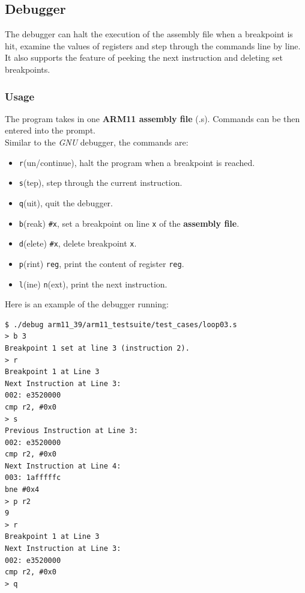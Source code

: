 \documentclass[11pt, a4paper]{article}
\begin{document}
\subsection{Debugger}
The debugger can halt the execution of the assembly file when a breakpoint is hit, examine the values of registers and step through the commands line by line. It also supports the feature of peeking the next instruction and deleting set breakpoints.
\subsubsection{Usage}
The program takes in one \textbf{ARM11 assembly file} (.s). Commands can be then entered into the prompt.\\ Similar to the \textit{GNU} debugger, the commands are:
\begin{itemize}
  \setlength\itemsep{0em}
  \item \texttt{r}(un/continue), halt the program when a breakpoint is reached.
  \item \texttt{s}(tep), step through the current instruction.
  \item \texttt{q}(uit), quit the debugger.
  \item \texttt{b}(reak) \texttt{\#x}, set a breakpoint on line \texttt{x} of the \textbf{assembly file}.
  \item \texttt{d}(elete) \texttt{\#x}, delete breakpoint \texttt{x}.
  \item \texttt{p}(rint) \texttt{reg}, print the content of register \texttt{reg}.
  \item \texttt{l}(ine) \texttt{n}(ext), print the next instruction.
\end{itemize}
Here is an example of the debugger running:
\begin{verbatim}
$ ./debug arm11_39/arm11_testsuite/test_cases/loop03.s
> b 3
Breakpoint 1 set at line 3 (instruction 2).
> r
Breakpoint 1 at Line 3
Next Instruction at Line 3: 
002: e3520000
cmp r2, #0x0
> s
Previous Instruction at Line 3: 
002: e3520000
cmp r2, #0x0
Next Instruction at Line 4: 
003: 1afffffc
bne #0x4
> p r2
9
> r
Breakpoint 1 at Line 3
Next Instruction at Line 3: 
002: e3520000
cmp r2, #0x0
> q
\end{verbatim}
\end{document}
